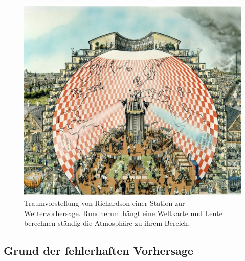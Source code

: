 \begin{figure}
	\centering
	\includegraphics[scale=0.8]{Richardsons_Traum.jpg}
	\caption{Traumvorstellung von Richardson einer Station zur Wettervorhersage. 
	Rundherum hängt eine Weltkarte und Leute berechnen ständig die Atmosphäre zu ihrem Bereich.}
	\label{bild:richardsonsTraum}
\end{figure}

\subsection{Grund der fehlerhaften Vorhersage \label{geostrophisch:subsection:failedPrediction}}

